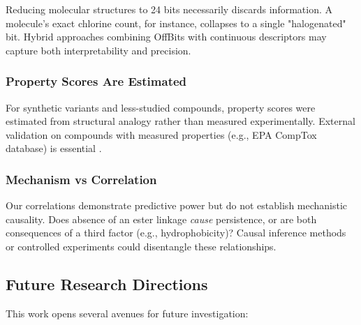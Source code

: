 \documentclass[11pt,letterpaper]{article}
\begin{document}
Reducing molecular structures to 24 bits necessarily discards information. A molecule's exact chlorine count, for instance, collapses to a single "halogenated" bit. Hybrid approaches combining OffBits with continuous descriptors may capture both interpretability and precision.

\subsubsection{Property Scores Are Estimated}

For synthetic variants and less-studied compounds, property scores were estimated from structural analogy rather than measured experimentally. External validation on compounds with measured properties (e.g., EPA CompTox database) is essential \cite{williams2017comptox}.

\subsubsection{Mechanism vs Correlation}

Our correlations demonstrate predictive power but do not establish mechanistic causality. Does absence of an ester linkage \textit{cause} persistence, or are both consequences of a third factor (e.g., hydrophobicity)? Causal inference methods or controlled experiments could disentangle these relationships.

\subsection{Future Research Directions}

This work opens several avenues for future investigation:
\end{document}
